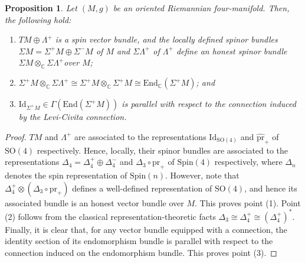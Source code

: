 \documentclass[10pt,a4paper]{amsart}
\newtheorem{proposition}{Proposition}
\begin{document}
\begin{proposition}\label{prop:spin}
    Let $(M,g)$ be an oriented Riemannian four-manifold. Then, the following hold: 
    \begin{enumerate}
        \item $TM \oplus \Lambda^+$ is a spin vector bundle, and the locally defined spinor bundles $\Sigma M = \Sigma^+ M \oplus \Sigma^- M$ of $M$ and $\Sigma \Lambda^+$ of $\Lambda^+$ define an honest spinor bundle $\Sigma M \otimes_{\mathbb{C}} \Sigma \Lambda^+$over $M$; 
        \item $\Sigma^+M \otimes_{\mathbb{C}} \Sigma \Lambda^+ \cong \Sigma^+M \otimes_{\mathbb{C}} \Sigma^+M \cong \mathrm{End}_{\mathbb{C}}(\Sigma^+M)$; and 
        \item $\mathrm{Id}_{\Sigma^+M} \in \Gamma(\mathrm{End}(\Sigma^+M))$ is parallel with respect to the connection induced by the Levi-Civita connection. 
    \end{enumerate}
\end{proposition}

\begin{proof}
    $TM$ and $\Lambda^+$ are associated to the representations $\mathrm{Id}_{\mathrm{SO}(4)}$ and $\widehat{\mathrm{pr}}_+$ of $\mathrm{SO}(4)$ respectively. Hence, locally, their spinor bundles are associated to the representations $\Delta_4 = \Delta^+_4 \oplus \Delta^-_4$ and $\Delta_3 \circ \mathrm{pr}_+$ of $\mathrm{Spin}(4)$ respectively, where $\Delta_n$ denotes the spin representation of $\mathrm{Spin}(n)$. However, note that $\Delta^+_4 \otimes (\Delta_3 \circ \mathrm{pr}_+)$ defines a well-defined representation of $\mathrm{SO}(4)$, and hence its associated bundle is an honest vector bundle over $M$. This proves point (1). Point (2) follows from the classical representation-theoretic facts $\Delta_3 \cong \Delta^+_4 \cong(\Delta^+_4)^*$. Finally, it is clear that, for any vector bundle equipped with a connection, the identity section of its endomorphism bundle is parallel with respect to the connection induced on the endomorphism bundle. This proves point (3). 
\end{proof}
\end{document}
